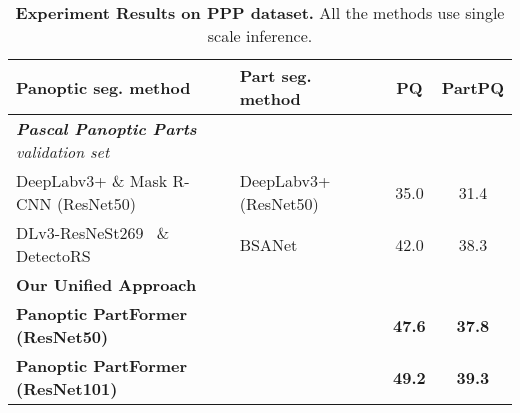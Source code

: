 \begin{table}[!t]\setlength{\tabcolsep}{6pt}
	\centering
	\begin{threeparttable}
		\caption{\small More detailed comparison on Cityscapes PPS dataset. GFlops are measured with 1200  800 input.}
		\label{tab:cpp_detailed}
	\end{threeparttable}
\end{table}



\begin{table}[t]
\centering
\begin{adjustbox}{width=0.50\textwidth}
\begin{tabular}{ll||cc}
\toprule[0.15em]
\textbf{Panoptic seg. method}  &  \textbf{Part seg. method}  & PQ & PartPQ \\ 
\midrule
\textit{\textbf{Pascal Panoptic Parts} validation set} \\
DeepLabv3+ \& Mask R-CNN \cite{maskrcnn}(ResNet50) & DeepLabv3+ \cite{deeplabv3plus}(ResNet50) & 35.0  &  31.4   \\ 
DLv3-ResNeSt269~\cite{zhang2020resnest} \& DetectoRS \cite{qiao2021detectors} &  BSANet \cite{Zhao2019BSANet}  & 42.0  & 38.3  \\ \hline
\textbf{Our Unified Approach} \\
\textbf{Panoptic PartFormer (ResNet50)} &  & \textbf{47.6} & \textbf{37.8} \\
\textbf{Panoptic PartFormer (ResNet101)} & & \textbf{49.2} & \textbf{39.3} \\
\bottomrule
\end{tabular}
\end{adjustbox}
\caption{\textbf{Experiment Results on PPP dataset.} All the methods use single scale inference.}
\label{tab:experiments_res_ppp}
\end{table}

